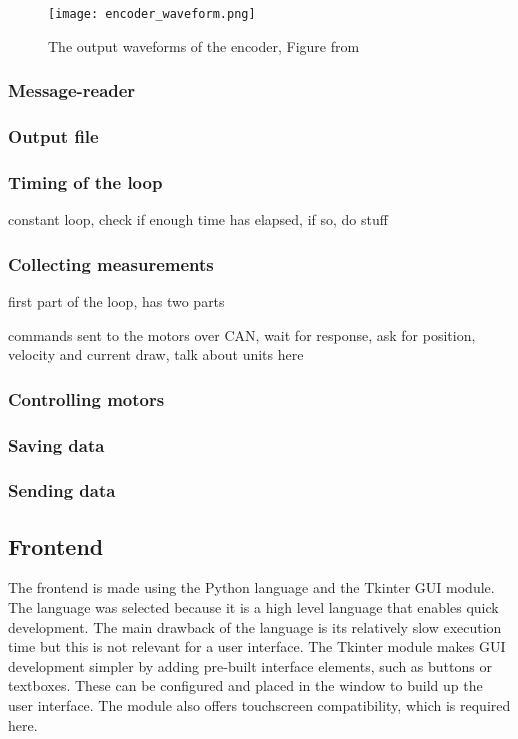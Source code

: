 \documentclass[12pt]{article}
\begin{document}
\begin{figure}
    \centering
    \texttt{[image: encoder\_waveform.png]}
    \caption{The output waveforms of the encoder, Figure from \cite{encoder}}
    \label{fig:encoder}
\end{figure}



\subsubsection{Message-reader}
\subsubsection{Output file}



\subsubsection{Timing of the loop}
constant loop, check if enough time has elapsed, if so, do stuff

\subsubsection{Collecting measurements}
first part of the loop, has two parts

commands sent to the motors over CAN, wait for response, ask for position, velocity and current draw, talk about units here



\subsubsection{Controlling motors}
\subsubsection{Saving data}
\subsubsection{Sending data}


\subsection{Frontend}
The frontend is made using the Python language and the Tkinter GUI module. The language was selected because it is a high level language that enables quick development. The main drawback of the language is its relatively slow execution time but this is not relevant for a user interface. The Tkinter module makes GUI development simpler by adding pre-built interface elements, such as buttons or textboxes. These can be configured and placed in the window to build up the user interface. The module also offers touchscreen compatibility, which is required here. 
\end{document}
